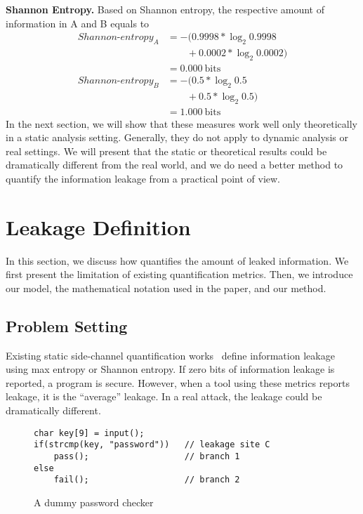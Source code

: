 \textbf{Shannon Entropy.}
Based on Shannon entropy, the respective amount of information in A and B equals to
{\footnotesize
\begin{align*}
    \mathit{Shannon\text{-}entropy_A} & = -(0.9998*\log_{2}0.9998      \\
                                    & \qquad+ 0.0002*\log_{2}0.0002)  \\
                                    & = 0.000\ \mathrm{bits}         \\
    \mathit{Shannon\text{-}entropy_B} & = -(0.5*\log_{2}0.5      \\
                                    & \qquad+ 0.5*\log_{2}0.5)        \\
                                    & = 1.000\ \mathrm{bits}                             
\end{align*}
}
In the next section, we will show that these measures work well only
theoretically in a static analysis setting. 
Generally, they do not apply to dynamic analysis or real
settings. We will present that the static or theoretical results could be
dramatically different from the real world, and we do need a better method to
quantify the information leakage from a practical point of view.

\section{Leakage Definition}

In this section, we discuss how \tool{} quantifies the amount of leaked
information. We first present the limitation of existing quantification metrics.
Then, we introduce our model, the mathematical notation used in the
paper, and our method.

\subsection{Problem Setting}
Existing static side-channel quantification
works~\cite{182946,Wichelmann:2018:MFF:3274694.3274741,zhang2010sidebuster,bang2016string} define information
leakage using max entropy or Shannon entropy.  If zero bits of
information leakage is reported, a program is secure. However, when a tool using these metrics reports leakage, it is the ``average'' leakage. In a real attack, the leakage could be dramatically different.

 \begin{figure}[h!]
    \vspace*{-5pt}
    \centering
    \begin{lstlisting}[xleftmargin=.03\textwidth,xrightmargin=.01\textwidth]
char key[9] = input();
if(strcmp(key, "password"))   // leakage site C
    pass();                   // branch 1
else
    fail();                   // branch 2
\end{lstlisting}
\vspace*{-10pt}
    \caption{A dummy password checker}
    \label{fig:password-checker}
\vspace*{-5pt}
\end{figure}


